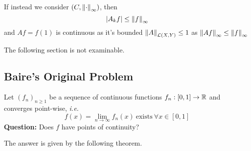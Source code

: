 \documentclass{article}
\begin{document}


\begin{remark}
    If instead we consider $(C, \left\|{\cdot}\right\|_\infty)$, then  
    $$
    |A_k f| \leq \left\|{f}\right\|_{\infty}
    $$
    and $Af=f(1)$ is continuous as it's bounded $\left\|{A}\right\|_{\mathcal{L}(X,Y)}\leq 1$ as $\left\|{Af}\right\|_{\infty} \leq \left\|{f}\right\|_\infty$
\end{remark}

The following section is not examinable.  


\subsection{Baire's Original Problem}
Let $(f_n)_{n\geq 1}$ be a sequence of continuous functions $f_n: [0,1] \to \mathbb{R}$ and converges point-wise, \textit{i.e.}  
$$
f(x) = \lim_{n\to\infty} f_n(x) \ \text{exists} \ \forall x \in [0,1]
$$  
\textbf{Question:} Does $f$ have points of continuity?  

The answer is given by the following theorem.  
\end{document}
